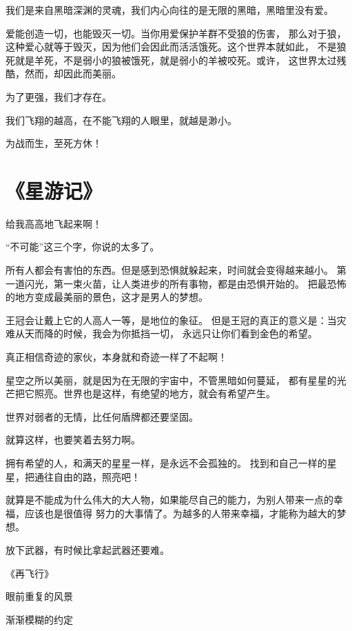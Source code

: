\documentclass[UTF8,oneside]{ctexbook}
\begin{document}
\mfApache \quad 我们是来自黑暗深渊的灵魂，我们内心向往的是无限的黑暗，黑暗里没有爱。

\mfApache \quad 爱能创造一切，也能毁灭一切。当你用爱保护羊群不受狼的伤害，
那么对于狼，这种爱心就等于毁灭，因为他们会因此而活活饿死。这个世界本就如此，
不是狼死就是羊死，不是弱小的狼被饿死，就是弱小的羊被咬死。或许，
这世界太过残酷，然而，却因此而美丽。

\mfApache \quad 为了更强，我们才存在。

\mfApache \quad 我们飞翔的越高，在不能飞翔的人眼里，就越是渺小。

\mfApache \quad 为战而生，至死方休！
\section{《星游记》}
\mfApache \quad 给我高高地飞起来啊！

\mfApache \quad “不可能”这三个字，你说的太多了。

\mfApache \quad 所有人都会有害怕的东西。但是感到恐惧就躲起来，时间就会变得越来越小。
第一道闪光，第一束火苗，让人类进步的所有事物，都是由恐惧开始的。
把最恐怖的地方变成最美丽的景色，这才是男人的梦想。

\mfApache \quad 王冠会让戴上它的人高人一等，是地位的象征。
但是王冠的真正的意义是：当灾难从天而降的时候，我会为你抵挡一切，
永远只让你们看到金色的希望。

\mfApache \quad 真正相信奇迹的家伙，本身就和奇迹一样了不起啊！

\mfApache \quad 星空之所以美丽，就是因为在无限的宇宙中，不管黑暗如何蔓延，
都有星星的光芒把它照亮。世界也是这样，有绝望的地方，就会有希望产生。

\mfApache \quad 世界对弱者的无情，比任何盾牌都还要坚固。

\mfApache \quad 就算这样，也要笑着去努力啊。

\mfApache \quad 拥有希望的人，和满天的星星一样，是永远不会孤独的。
找到和自己一样的星星，把通往自由的路，照亮吧！

\mfApache \quad 就算是不能成为什么伟大的大人物，如果能尽自己的能力，为别人带来一点的幸福，应该也是很值得
努力的大事情了。为越多的人带来幸福，才能称为越大的梦想。

\mfApache \quad 放下武器，有时候比拿起武器还要难。

\mfApache \quad \quad \quad \quad \quad 《再飞行》

\quad \quad \quad \quad \quad 眼前重复的风景

\quad \quad \quad \quad \quad 渐渐模糊的约定
\end{document}
